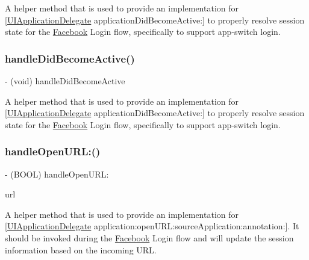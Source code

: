 A helper method that is used to provide an implementation for \mbox{[}\hyperlink{classUIApplicationDelegate-p}{U\+I\+Application\+Delegate} application\+Did\+Become\+Active\+:\mbox{]} to properly resolve session state for the \hyperlink{interfaceFacebook}{Facebook} Login flow, specifically to support app-\/switch login. \mbox{\label{interfaceFBSession_a647536f4770fc746b6865ad610779767}} 
\subsubsection{\texorpdfstring{handle\+Did\+Become\+Active()}{handleDidBecomeActive()}\hspace{0.1cm}{\footnotesize\ttfamily [5/5]}}
{\footnotesize\ttfamily -\/ (void) handle\+Did\+Become\+Active \begin{DoxyParamCaption}{ }\end{DoxyParamCaption}}

A helper method that is used to provide an implementation for \mbox{[}\hyperlink{classUIApplicationDelegate-p}{U\+I\+Application\+Delegate} application\+Did\+Become\+Active\+:\mbox{]} to properly resolve session state for the \hyperlink{interfaceFacebook}{Facebook} Login flow, specifically to support app-\/switch login. \mbox{\label{interfaceFBSession_a99548fc3fd7dc7f5b8dc24019be88000}} 
\subsubsection{\texorpdfstring{handle\+Open\+U\+R\+L\+:()}{handleOpenURL:()}\hspace{0.1cm}{\footnotesize\ttfamily [1/5]}}
{\footnotesize\ttfamily -\/ (B\+O\+OL) handle\+Open\+U\+R\+L\+: \begin{DoxyParamCaption}\item[{(N\+S\+U\+RL $\ast$)}]{url }\end{DoxyParamCaption}}

A helper method that is used to provide an implementation for \mbox{[}\hyperlink{classUIApplicationDelegate-p}{U\+I\+Application\+Delegate} application\+:open\+U\+R\+L\+:source\+Application\+:annotation\+:\mbox{]}. It should be invoked during the \hyperlink{interfaceFacebook}{Facebook} Login flow and will update the session information based on the incoming U\+RL.


